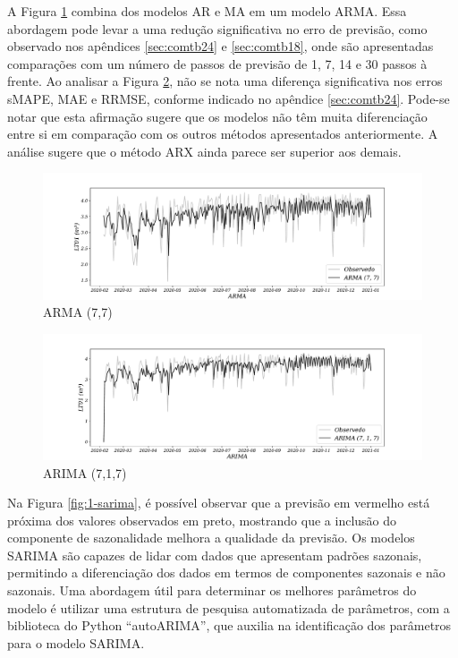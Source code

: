 A Figura \ref{fig:1-arma} combina dos modelos AR e MA em um modelo ARMA. Essa abordagem pode levar a uma redução significativa no erro de previsão, como observado nos apêndices \ref{sec:comtb24} e \ref{sec:comtb18}, onde são apresentadas comparações com um número de passos de previsão de 1, 7, 14 e 30 passos à frente.
Ao analisar a Figura \ref{fig:1-arima}, não se nota uma diferença significativa nos erros sMAPE, MAE e RRMSE, conforme indicado no apêndice \ref{sec:comtb24}. Pode-se notar que esta afirmação sugere que os modelos não têm muita diferenciação entre si em comparação com os outros métodos apresentados anteriormente. A análise sugere que o método ARX ainda parece ser superior aos demais.


\begin{figure}[H]
	\centering
	\caption{ARMA (7,7)}
	\label{fig:1-arma}
	\includegraphics[width=1\linewidth]{Modelos/Figuras/ARMA}
	
	
\end{figure}



\begin{figure}[H]
	\centering
	\caption{ARIMA (7,1,7)}
	\label{fig:1-arima}
	\includegraphics[width=1\linewidth]{Modelos/Figuras/ARIMA}
	
	
\end{figure}


Na Figura \ref{fig:1-sarima}, é possível observar que a previsão em vermelho está próxima dos valores observados em preto, mostrando que a inclusão do componente de sazonalidade melhora a qualidade da previsão. Os modelos SARIMA são capazes de lidar com dados que apresentam padrões sazonais, permitindo a diferenciação dos dados em termos de componentes sazonais e não sazonais. Uma abordagem útil para determinar os melhores parâmetros do modelo é utilizar uma estrutura de pesquisa automatizada de parâmetros, com a biblioteca do Python ``autoARIMA'', que auxilia na identificação dos parâmetros para o modelo SARIMA. 

